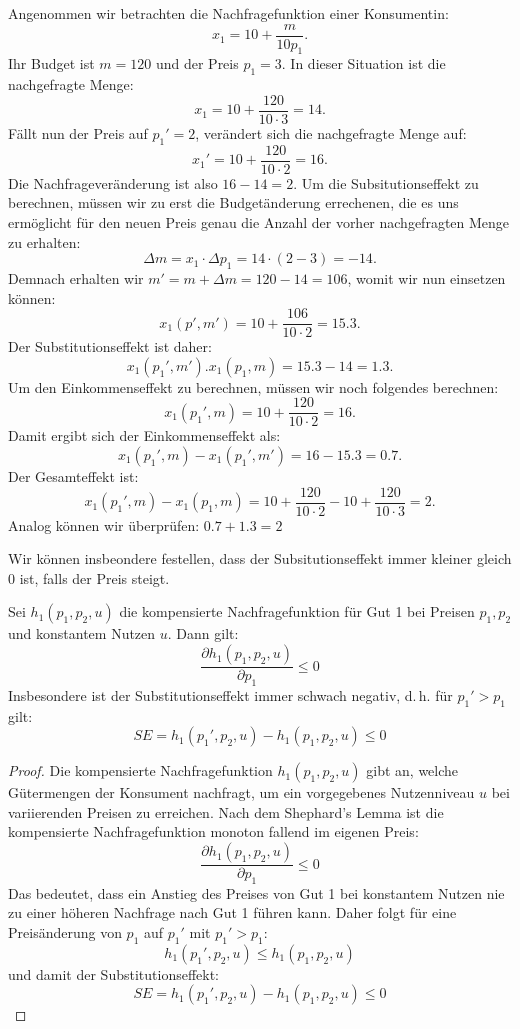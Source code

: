 \begin{example}
	Angenommen wir betrachten die Nachfragefunktion einer Konsumentin:
	\[
		x_1 = 10 + \frac{m}{10p_1}
		.\]
	Ihr Budget ist $m=120$ und der Preis $p_1 = 3$. In dieser Situation ist die nachgefragte Menge:
	\[
		x_1 = 10 + \frac{120}{10\cdot 3} = 14
		.\]
	Fällt nun der Preis auf $p_1' = 2$, verändert sich die nachgefragte Menge auf:
	\[
		x_1' = 10 + \frac{120}{10\cdot 2} = 16
		.\]
	Die Nachfrageveränderung ist also $16-14 = 2$. Um die Subsitutionseffekt zu berechnen, müssen wir zu erst die Budgetänderung errechenen, die es uns ermöglicht für den neuen Preis genau die Anzahl der vorher nachgefragten Menge zu erhalten:
	\[
		\Delta m = x_1 \cdot  \Delta p_1 = 14 \cdot  (2-3) = - 14
		.\]
	Demnach erhalten wir $m' = m + \Delta m = 120-14 = 106$, womit wir nun einsetzen können:
	\[
		x_1(p',m') =  10 + \frac{106}{10\cdot 2} = 15.3
		.\]
	Der Substitutionseffekt ist daher:
	\[
		x_1(p_1', m') . x_1(p_1,m) = 15.3 - 14 = 1.3
		.\]
	Um den Einkommenseffekt zu berechnen, müssen wir noch folgendes berechnen:
	\[
		x_1(p_1',m) = 10 + \frac{120}{10\cdot 2} = 16
		.\]
	Damit ergibt sich der Einkommenseffekt als:
	\[
		x_1(p_1',m) - x_1(p_1', m') = 16 -15.3= 0.7
		.\]
	Der Gesamteffekt ist:
	\[
		x_1(p_1',m) - x_1(p_1,m) = 10+ \frac{120}{10\cdot 2} - 10 + \frac{120}{10\cdot 3} = 2
		.\]
	Analog können wir überprüfen: $0.7 + 1.3 = 2$
\end{example}

Wir können insbeondere festellen, dass der Subsitutionseffekt immer kleiner gleich $0$ ist, falls der Preis steigt.

\begin{lemma}
	Sei \( h_1(p_1, p_2, u) \) die kompensierte Nachfragefunktion für Gut 1 bei Preisen \( p_1, p_2 \) und konstantem Nutzen \( u \). Dann gilt:
	\[
		\frac{\partial h_1(p_1, p_2, u)}{\partial p_1} \leq 0
	\]
	Insbesondere ist der Substitutionseffekt immer schwach negativ, d.\,h. für \( p_1' > p_1 \) gilt:
	\[
		SE = h_1(p_1', p_2, u) - h_1(p_1, p_2, u) \leq 0
	\]
\end{lemma}

\begin{proof}
	Die kompensierte Nachfragefunktion \( h_1(p_1, p_2, u) \) gibt an, welche Gütermengen der Konsument nachfragt, um ein vorgegebenes Nutzenniveau \( u \) bei variierenden Preisen zu erreichen. Nach dem Shephard's Lemma ist die kompensierte Nachfragefunktion monoton fallend im eigenen Preis:
	\[
		\frac{\partial h_1(p_1, p_2, u)}{\partial p_1} \leq 0
	\]
	Das bedeutet, dass ein Anstieg des Preises von Gut 1 bei konstantem Nutzen nie zu einer höheren Nachfrage nach Gut 1 führen kann.
	Daher folgt für eine Preisänderung von \( p_1 \) auf \( p_1' \) mit \( p_1' > p_1 \):
	\[
		h_1(p_1', p_2, u) \leq h_1(p_1, p_2, u)
	\]
	und damit der Substitutionseffekt:
	\[
		SE = h_1(p_1', p_2, u) - h_1(p_1, p_2, u) \leq 0
	\]
\end{proof}

